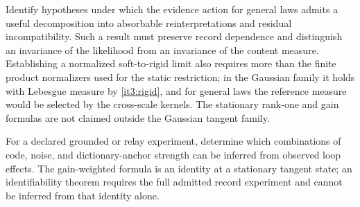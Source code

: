 Identify hypotheses under which the evidence action for general laws admits a useful decomposition into absorbable reinterpretations and residual incompatibility. Such a result must preserve record dependence and distinguish an invariance of the likelihood from an invariance of the content measure. Establishing a normalized soft-to-rigid limit also requires more than the finite product normalizers used for the static restriction; in the Gaussian family it holds with Lebesgue measure by \cref{it3:rigid}, and for general laws the reference measure would be selected by the cross-scale kernels. The stationary rank-one and gain formulas are not claimed outside the Gaussian tangent family.

For a declared grounded or relay experiment, determine which combinations of code, noise, and dictionary-anchor strength can be inferred from observed loop effects. The gain-weighted formula is an identity at a stationary tangent state; an identifiability theorem requires the full admitted record experiment and cannot be inferred from that identity alone.
